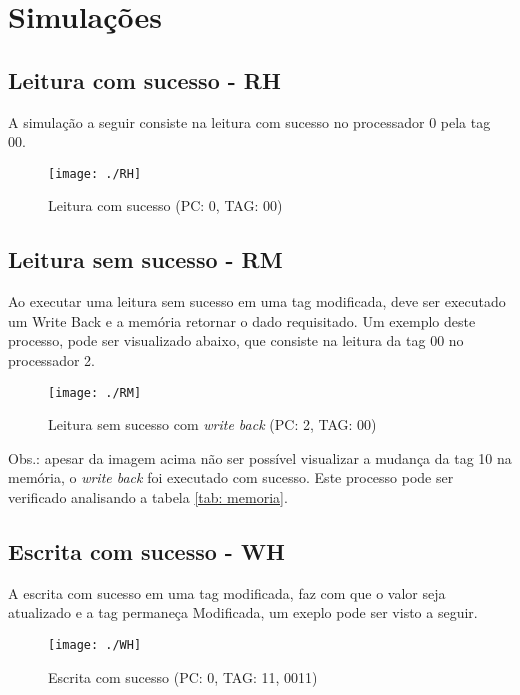 \documentclass[12pt]{article}
\begin{document}
\section{Simulações}

\subsection{Leitura com sucesso - RH}

\par A simulação a seguir consiste na leitura com sucesso no processador 0 pela tag 00.

\begin{figure}[H]
	\centering
	\texttt{[image: ./RH]}
	\caption{Leitura com sucesso (PC: 0, TAG: 00)}
	\label{fig: RH}
\end{figure}

\subsection{Leitura sem sucesso - RM}

\par Ao executar uma leitura sem sucesso em uma tag modificada, deve ser executado um Write Back e a memória retornar o dado requisitado. Um exemplo deste processo, pode ser visualizado abaixo, que consiste na leitura da tag 00 no processador 2.

\begin{figure}[H]
	\centering
	\texttt{[image: ./RM]}
	\caption{Leitura sem sucesso com \textit{write back} (PC: 2, TAG: 00)}
	\label{fig: RH}
\end{figure}

\par Obs.: apesar da imagem acima não ser possível visualizar a mudança da tag 10 na memória, o \textit{write back} foi executado com sucesso. Este processo pode ser verificado analisando a tabela \ref{tab: memoria}.

\subsection{Escrita com sucesso - WH}

\par A escrita com sucesso em uma tag modificada, faz com que o valor seja atualizado e a tag permaneça Modificada, um exeplo pode ser visto a seguir.

\begin{figure}[H]
	\centering
	\texttt{[image: ./WH]}
	\caption{Escrita com sucesso (PC: 0, TAG: 11, 0011)}
	\label{fig: WH}
\end{figure}
\end{document}
